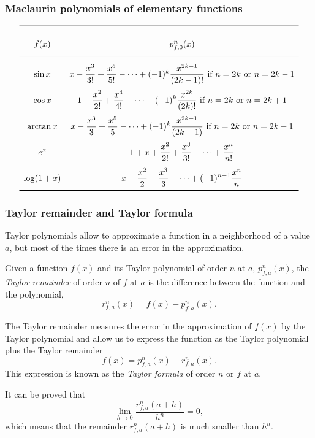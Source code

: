 \begin{frame}
	\frametitle{Maclaurin polynomials of elementary functions}
	\[
		\renewcommand{\arraystretch}{2.5}
		\begin{array}{cc}
			\toprule
			f(x)      & p_{f,0}^n(x)                                                                                                              \\
			\midrule
			\sin x    & \displaystyle x - \frac{x^3}{3!} + \frac{x^5}{5!} - \cdots + (-1)^k\frac{x^{2k-1}}{(2k-1)!} \mbox{ if $n=2k$ or $n=2k-1$} \\
			\cos x    & \displaystyle 1 - \frac{x^2}{2!} + \frac{x^4}{4!} - \cdots + (-1)^k\frac{x^{2k}}{(2k)!} \mbox{ if $n=2k$ or $n=2k+1$}     \\
			\arctan x & \displaystyle x - \frac{x^3}{3} + \frac{x^5}{5} - \cdots + (-1)^k\frac{x^{2k-1}}{(2k-1)} \mbox{ if $n=2k$ or $n=2k-1$}    \\
			e^x       & \displaystyle 1 + x + \frac{x^2}{2!} + \frac{x^3}{3!} + \cdots + \frac{x^n}{n!}                                           \\
			\log(1+x) & \displaystyle x - \frac{x^2}{2} + \frac{x^3}{3} - \cdots + (-1)^{n-1}\frac{x^n}{n}                                        \\
			\bottomrule
		\end{array}
	\]
\end{frame}


\begin{frame}
	\frametitle{Taylor remainder and Taylor formula}
	Taylor polynomials allow to approximate a function in a neighborhood of a value $a$, but most of the times there is an error in the approximation.
	\begin{definition}
		Given a function  $f(x)$ and its Taylor polynomial of order $n$ at $a$, $p_{f,a}^n(x)$, the \emph{Taylor remainder} of order $n$ of $f$ at $a$ is the difference between the function and the polynomial,
		\[
			r_{f,a}^n(x)=f(x)-p_{f,a}^n(x).
		\]
	\end{definition}
	
	The Taylor remainder measures the error in the approximation of $f(x)$ by the Taylor polynomial and allow us to express the function as the Taylor polynomial plus the Taylor remainder
	\[
		f(x)=p_{f,a}^n(x) + r_{f,a}^n(x).
	\]
	This expression is known as the \emph{Taylor formula} of order $n$ or $f$ at $a$. 
	
	It can be proved that
	\[
		\lim_{h\rightarrow 0}\frac{r_{f,a}^n(a+h)}{h^n}=0,
	\]
	which means that the remainder $r_{f,a}^n(a+h)$ is much smaller than $h^n$.
\end{frame}




